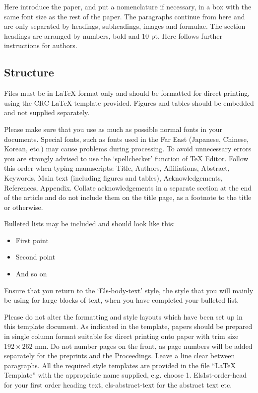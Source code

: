\documentclass[5p,times,procedia]{elsarticle}
\begin{document}
Here introduce the paper, and put a nomenclature if necessary, in a box with the same font size as the rest of the paper. The paragraphs continue from here and are only separated by headings, subheadings, images and formulae. The section headings are arranged by numbers, bold and 10 pt. Here follows further instructions for authors.

\vspace*{8pt}
\begin{nomenclature}
\begin{deflist}[A]
\end{deflist}
\end{nomenclature}\vskip12pt

\subsection{ Structure}
Files must be in LaTeX format only and should be formatted for direct printing, using the CRC LaTeX template provided. Figures and tables should be embedded and not supplied separately. 

Please make sure that you use as much as possible normal fonts in your documents. Special fonts, such as fonts used in\vadjust{\vfill\pagebreak} the Far East (Japanese, Chinese, Korean, etc.) may cause problems during processing. To avoid unnecessary errors you are strongly advised to use the `spellchecker' function of TeX Editor. Follow this order when typing manuscripts: Title, Authors, Affiliations, Abstract, Keywords, Main text (including figures and tables), Acknowledgements, References, Appendix. Collate acknowledgements in a separate section at the end of the article and do not include them on the title page, as a footnote to the title or otherwise.

Bulleted lists may be included and should look like this:
\begin{itemize}[]
\item First point
\item Second point
\item And so on
\end{itemize}

Ensure that you return to the `Els-body-text' style, the style that you will mainly be using for large blocks of text, when you have completed your bulleted list. 

Please do not alter the formatting and style layouts which have been set up in this template document. As indicated in the template, papers should be prepared in single column format suitable for direct printing onto paper with trim size $192 \times 262$ mm. Do not number pages on the front, as page numbers will be added separately for the preprints and the Proceedings. Leave a line clear between paragraphs. All the required style templates are provided in the file ``LaTeX Template'' with the appropriate name supplied, e.g. choose 1. Els1st-order-head for your first order heading text, els-abstract-text for the abstract text etc.
\end{document}
